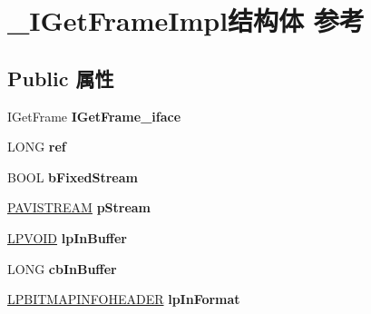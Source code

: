 \hypertarget{struct___i_get_frame_impl}{}\section{\+\_\+\+I\+Get\+Frame\+Impl结构体 参考}
\label{struct___i_get_frame_impl}
\subsection*{Public 属性}
\begin{DoxyCompactItemize}
\item 
\mbox{\label{struct___i_get_frame_impl_a62580d99a9a094dc44cb473adf2bf7c0}} 
I\+Get\+Frame {\bfseries I\+Get\+Frame\+\_\+iface}
\item 
\mbox{\label{struct___i_get_frame_impl_a9e1aaf6611af3cb35a1f2d2ff68ae348}} 
L\+O\+NG {\bfseries ref}
\item 
\mbox{\label{struct___i_get_frame_impl_ab043e67868a68e6dc702015d4050c407}} 
B\+O\+OL {\bfseries b\+Fixed\+Stream}
\item 
\mbox{\label{struct___i_get_frame_impl_acb7539fe337631b5b2570087f8e1d5a0}} 
\hyperlink{interface_i_a_v_i_stream}{P\+A\+V\+I\+S\+T\+R\+E\+AM} {\bfseries p\+Stream}
\item 
\mbox{\label{struct___i_get_frame_impl_a926d92ce2434b076c8d5f33784904668}} 
\hyperlink{interfacevoid}{L\+P\+V\+O\+ID} {\bfseries lp\+In\+Buffer}
\item 
\mbox{\label{struct___i_get_frame_impl_a2a3b8bc6492d57f127850002ebd17cdd}} 
L\+O\+NG {\bfseries cb\+In\+Buffer}
\item 
\mbox{\label{struct___i_get_frame_impl_aa1e39ef929f98d57160ca53641aa9dce}} 
\hyperlink{struct_b_i_t_m_a_p_i_n_f_o_h_e_a_d_e_r}{L\+P\+B\+I\+T\+M\+A\+P\+I\+N\+F\+O\+H\+E\+A\+D\+ER} {\bfseries lp\+In\+Format}
\item 
\mbox{\label{struct___i_get_frame_impl_a5dcdee302cd58665c787b2f7dadee6d4}} 

\end{DoxyCompactItemize}
